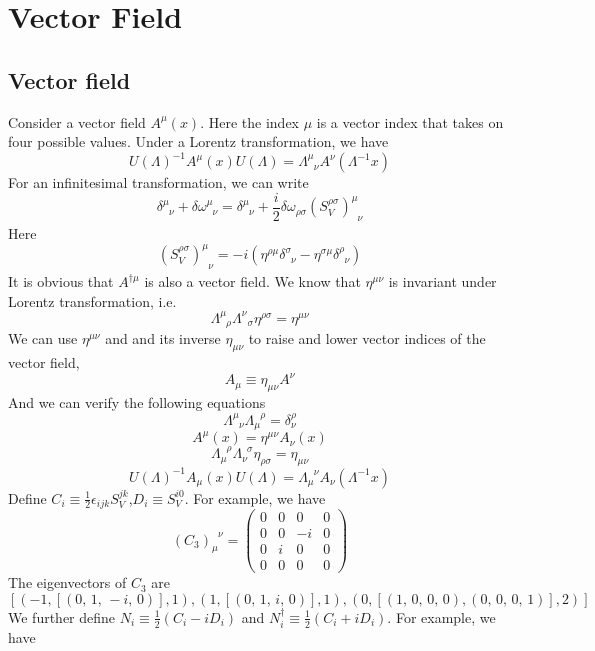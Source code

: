 \chapter{Vector Field}
\section{Vector field}
Consider a vector field $A^{\mu}(x)$. Here the index $\mu$ is a vector index that takes on four possible values. Under a Lorentz transformation, we have
\[U(\Lambda)^{-1} A^{\mu}(x) U(\Lambda) = \Lambda^{\mu}_{\phantom{\mu}\nu} A^{\nu}(\Lambda^{-1}x)\]
For an infinitesimal transformation, we can write
\[\delta^{\mu}_{\phantom{\mu}\nu}+\delta \omega ^{\mu}_{\phantom{\mu}\nu} = \delta^{\mu}_{\phantom{\mu}\nu} + \frac{i}{2} \delta \omega_{\rho \sigma} (S_V^{\rho \sigma})^{\mu}_{\phantom{\mu}\nu}\]
Here
\[(S_V^{\rho \sigma})^{\mu}_{\phantom{\mu}\nu} = -i(\eta^{\rho \mu}\delta ^{\sigma}_{\phantom{\sigma}\nu} - \eta^{\sigma \mu}\delta^{\rho}_{\phantom{\rho}\nu})\]
It is obvious that $A^{\dagger \mu}$ is also a vector field. 
We know that $\eta^{\mu \nu}$ is invariant under Lorentz transformation, i.e.
\[\Lambda^{\mu}_{\phantom{\mu}\rho} \Lambda^{\nu}_{\phantom{\mu}\sigma} \eta^{\rho \sigma} = \eta^{\mu \nu} \]
We can use $\eta^{\mu \nu}$ and and its inverse $\eta_{\mu\nu}$ to raise and lower vector indices of the vector field,
\[A_{\mu} \equiv \eta_{\mu \nu} A^{\nu}\]
And we can verify the following equations
\[\Lambda^{\mu}_{\phantom{\mu}\nu} \Lambda_{\mu}^{\phantom{\mu}\rho} = \delta^{\rho}_{\nu} \]
\[A^{\mu}(x) = \eta^{\mu \nu} A_{\nu}(x)\]
\[\Lambda_{\mu}^{\phantom{\mu}\rho} \Lambda_{\nu}^{\phantom{\nu}\sigma} \eta_{\rho \sigma} = \eta_{\mu \nu}\]
\[U(\Lambda)^{-1} A_{\mu}(x) U(\Lambda) = \Lambda_{\mu}^{\phantom{\mu}\nu} A_{\nu}(\Lambda^{-1}x)\]
Define $C_i \equiv \frac{1}{2}\epsilon_{ijk}S_V^{jk}$,$D_i \equiv S_V^{i0}$. For example, we have
\[(C_3)_{\mu}^{\phantom{\mu}\nu} = \left(\begin{array}{rrrr}
0 & 0 & 0 & 0 \\
0 & 0 & -i & 0 \\
0 & i & 0 & 0 \\
0 & 0 & 0 & 0
\end{array}\right)\]
The eigenvectors of $C_3$ are
\[\left[\left(-1, \left[\left(0,\,1,\,-i,\,0\right)\right], 1\right),
\left(1, \left[\left(0,\,1,\,i,\,0\right)\right], 1\right), \left(0,
\left[\left(1,\,0,\,0,\,0\right), \left(0,\,0,\,0,\,1\right)\right],
2\right)\right]\]
We further define $N_i \equiv \frac{1}{2}(C_i-iD_i)$ and $N^{\dagger}_i \equiv \frac{1}{2}(C_i + i D_i)$. For example, we have
